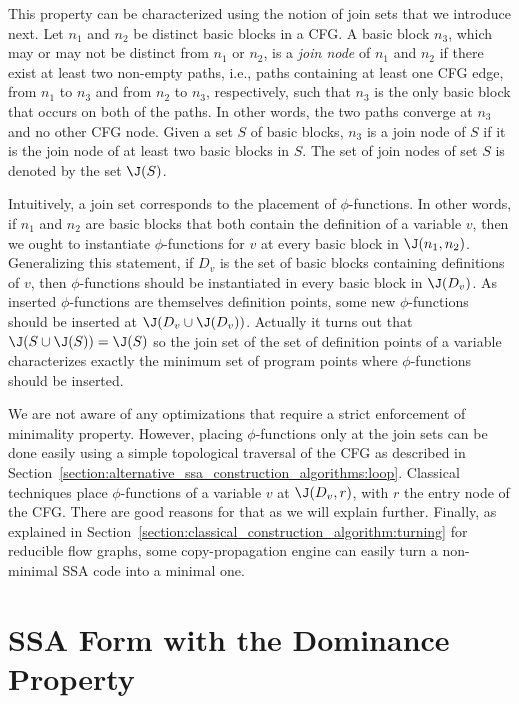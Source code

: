 This property can be characterized using the notion of join sets that we introduce next.
Let $n_{1}$ and $n_{2}$ be distinct basic blocks in a CFG. A basic block
$n_{3}$, which may or may not be distinct from $n_{1}$ or $n_{2}$, is 
a \emph{join node} of $n_{1}$ and $n_{2}$ if there exist at least two
non-empty paths, i.e., paths containing at least one CFG edge, from 
$n_{1}$ to $n_{3}$ and from $n_{2}$ to $n_{3}$, respectively, such that
$n_{3}$ is the only basic block that occurs on both of the paths. In
other words, the two paths converge at $n_{3}$ and no other CFG node. 
Given a set $S$ of basic blocks, $n_{3}$ is a join node of $S$ if it
is the join node of at least two basic blocks in $S$. The set of join
nodes of set $S$ is denoted by the set $\J(S)$. 

Intuitively, a join set corresponds to the placement of $\phi$-functions.
In other words, if $n_{1}$ and $n_{2}$ are basic blocks that both
contain the definition of a variable $v$, then we ought to instantiate
$\phi$-functions for $v$ at every basic block in $\J(n_{1}, n_{2})$. 
Generalizing this statement, if $D_v$ is the set of basic blocks containing
definitions of $v$, then $\phi$-functions should be instantiated in
every basic block in $\J(D_v)$. As inserted $\phi$-functions are themselves 
definition points, some new $\phi$-functions should be inserted at $\J(D_v\cup\J(D_v))$. 
Actually it turns out that $\J(S\cup\J(S))=\J(S)$ so the join set of the set of definition points of a variable characterizes exactly the minimum set of program points where $\phi$-functions should be inserted.

We are not aware of any optimizations that require a strict enforcement of minimality property.
However, placing $\phi$-functions only at the join sets can be done easily using a simple topological traversal of the CFG as described in Section~\ref{section:alternative_ssa_construction_algorithms:loop}. Classical techniques place $\phi$-functions of a variable $v$ at $\J(D_v,r)$, with $r$ the entry node of the CFG. There are good reasons for that as we will explain further. Finally, as explained in Section~\ref{section:classical_construction_algorithm:turning} for reducible flow graphs, some copy-propagation engine can easily turn a non-minimal SSA code into a minimal one.

\section{SSA Form with the Dominance Property}
\label{sec-prop-dominance}

